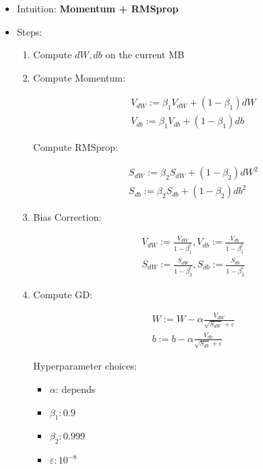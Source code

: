 \documentclass[
]{book}
\providecommand{\tightlist}{%
  \setlength{\itemsep}{0pt}\setlength{\parskip}{0pt}}
\begin{document}
\begin{itemize}
\item
  Intuition: \textbf{Momentum + RMSprop}
\item
  Steps:

  \begin{enumerate}
  \def\labelenumi{\arabic{enumi}.}
  \item
    Compute \(dW,db\) on the current MB
  \item
    Compute Momentum:

    \[\begin{align}
     &V_{dW}:=\beta_1 V_{dW}+(1-\beta_1)dW \\
     &V_{db}:=\beta_1 V_{db}+(1-\beta_1)db
     \end{align}\]

    Compute RMSprop:

    \[\begin{align}
     &S_{dW}:=\beta_2 S_{dW}+(1-\beta_2)dW^2 \\
     &S_{db}:=\beta_2 S_{db}+(1-\beta_2)db^2
     \end{align}\]
  \item
    Bias Correction:

    \[\begin{align}
     &V_{dW}:=\frac{V_{dW}}{1-\beta_1^t}, V_{db}:=\frac{V_{db}}{1-\beta_1^t} \\
     &S_{dW}:=\frac{S_{dW}}{1-\beta_2^t}, S_{db}:=\frac{S_{db}}{1-\beta_2^t}
     \end{align}\]
  \item
    Compute GD:

    \[\begin{align}
     &W:=W-\alpha \frac{V_{dW}}{\sqrt{S_{dW}}+\varepsilon} \\
     &b:=b-\alpha \frac{V_{db}}{\sqrt{S_{db}}+\varepsilon}
     \end{align}\]

    Hyperparameter choices:

    \begin{itemize}
    \tightlist
    \item
      \(\alpha\): depends
    \item
      \(\beta_1: 0.9\)
    \item
      \(\beta_2: 0.999\)
    \item
      \(\varepsilon: 10^{-8}\)
    \end{itemize}
  \end{enumerate}
\end{itemize}
\end{document}
